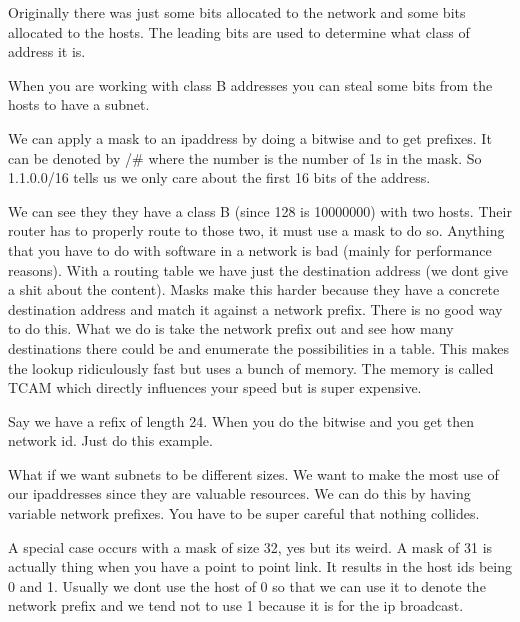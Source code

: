 \documentclass[12pt]{article}
\begin{document}

Originally there was just some bits allocated to the network and some bits allocated to the hosts. The leading bits are used to determine what class of address it is. 


When you are working with class B addresses you can steal some bits from the hosts to have a subnet.


We can apply a mask to an ipaddress by doing a bitwise and to get prefixes. It can be denoted by /# where the number is the number of 1s in the mask. So 1.1.0.0/16 tells us we only care about the first 16 bits of the address.


We can see they they have a class B (since 128 is 10000000) with two hosts. Their router has to properly route to those two, it must use a mask to do so. Anything that you have to do with software in a network is bad (mainly for performance reasons). With a routing table we have just the destination address (we dont give a shit about the content). Masks make this harder because they have a concrete destination address and match it against a network prefix. There is no good way to do this. What we do is take the network prefix out and see how many destinations there could be and enumerate the possibilities in a table. This makes the lookup ridiculously fast but uses a bunch of memory. The memory is called TCAM which directly influences your speed but is super expensive. 


Say we have a refix of length 24. When you do the bitwise and you get then network id. Just do this example. 


What if we want subnets to be different sizes. We want to make the most use of our ipaddresses since they are valuable resources. We can do this by having variable network prefixes. You have to be super careful that nothing collides. 


A special case occurs with a mask of size 32, yes but its weird. A mask of 31 is actually thing when you have a point to point link. It results in the host ids being 0 and 1. Usually we dont use the host of 0 so that we can use it to denote the network prefix and we tend not to use 1 because it is for the ip broadcast.
\end{document}
